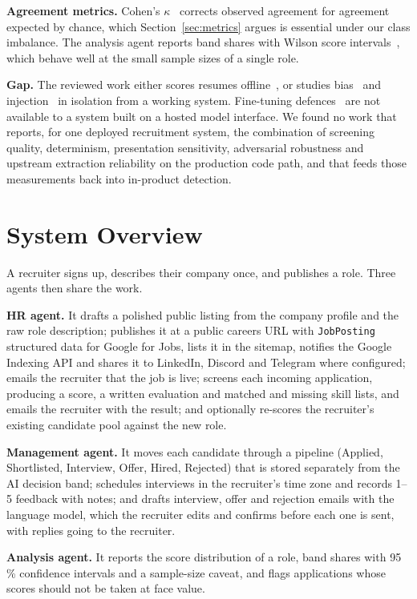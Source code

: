 \documentclass[conference]{IEEEtran}
\begin{document}
\textbf{Agreement metrics.} Cohen's $\kappa$~\cite{b24} corrects observed
agreement for agreement expected by chance, which Section~\ref{sec:metrics}
argues is essential under our class imbalance. The analysis agent reports band
shares with Wilson score intervals~\cite{b25}, which behave well at the small
sample sizes of a single role.

\textbf{Gap.} The reviewed work either scores resumes offline~\cite{b1,b2,b3,b4},
or studies bias~\cite{b13,b14} and injection~\cite{b17,b18,b23} in isolation
from a working system. Fine-tuning defences~\cite{b22} are not available to a
system built on a hosted model interface. We found no work that reports, for one
deployed recruitment system, the combination of screening quality, determinism,
presentation sensitivity, adversarial robustness and upstream extraction
reliability on the production code path, and that feeds those measurements back
into in-product detection.

\section{System Overview}
\label{sec:overview}

A recruiter signs up, describes their company once, and publishes a role. Three
agents then share the work.

\textbf{HR agent.} It drafts a polished public listing from the company profile
and the raw role description; publishes it at a public careers URL with
\texttt{JobPosting} structured data for Google for Jobs, lists it in the
sitemap, notifies the Google Indexing API and shares it to LinkedIn, Discord and
Telegram where configured; emails the recruiter that the job is live; screens
each incoming application, producing a score, a written evaluation and matched
and missing skill lists, and emails the recruiter with the result; and
optionally re-scores the recruiter's existing candidate pool against the new
role.

\textbf{Management agent.} It moves each candidate through a pipeline (Applied,
Shortlisted, Interview, Offer, Hired, Rejected) that is stored separately from
the AI decision band; schedules interviews in the recruiter's time zone and
records 1--5 feedback with notes; and drafts interview, offer and rejection
emails with the language model, which the recruiter edits and confirms before
each one is sent, with replies going to the recruiter.

\textbf{Analysis agent.} It reports the score distribution of a role, band
shares with 95\,\% confidence intervals and a sample-size caveat, and flags
applications whose scores should not be taken at face value.
\end{document}
